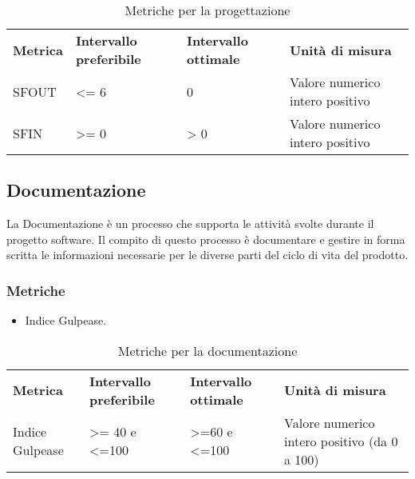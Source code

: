 \renewcommand{\arraystretch}{2.2}
\begin{longtable}{|C{4.5cm}|C{2.25cm}|C{2.25cm}|C{3cm}|}

	\caption{Metriche per la progettazione}\\
	\hline

	\textbf{Metrica} & \textbf{Intervallo preferibile}  & \textbf{Intervallo ottimale} & \textbf{Unità di misura}
	\tabularnewline
	\endfirsthead

	SFOUT & <= 6  & 0 & Valore numerico intero positivo \\
	SFIN &  >= 0 & > 0 & Valore numerico intero positivo \\
\end{longtable}




\subsection{Documentazione}
La Documentazione è un processo che supporta le attività svolte durante
il progetto software.
Il compito di questo processo è documentare e
gestire in forma scritta le informazioni necessarie per le diverse parti del
ciclo di vita del prodotto.
\subsubsection{Metriche}
\begin{itemize}
	\item Indice Gulpease.
\end{itemize}

\renewcommand{\arraystretch}{2.2}
\begin{longtable}{|C{2.5cm}|C{3.25cm}|C{3.25cm}|C{3cm}|}

	\caption{Metriche per la documentazione}\\
	\hline

	\textbf{Metrica} & \textbf{Intervallo preferibile}  & \textbf{Intervallo ottimale} & \textbf{Unità di misura}
	\tabularnewline
	\endfirsthead

	Indice Gulpease & >= 40 e <=100  & >=60 e <=100 & Valore numerico intero positivo (da 0 a 100) \\

\end{longtable}




